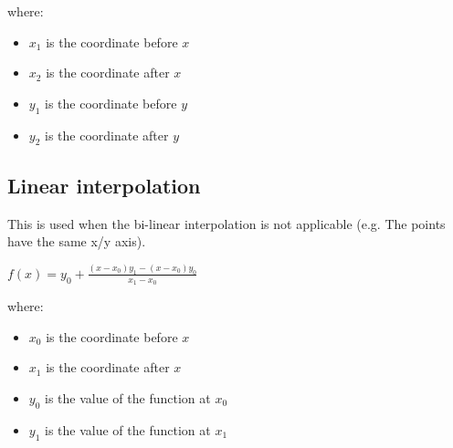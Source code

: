 where:
\begin{itemize}
\item $x_1$ is the coordinate before $x$
\item $x_2$ is the coordinate after $x$
\item $y_1$ is the coordinate before $y$
\item $y_2$ is the coordinate after $y$
\end{itemize}
\subsection{Linear interpolation}
This is used when the bi-linear interpolation is not applicable (e.g. The points have the same x/y axis).

$f(x) = y_0 + \frac{(x - x_0)y_1 - (x - x_0)y_0}{x_1 - x_0}$

where:
\begin{itemize}
\item $x_0$ is the coordinate before $x$
\item $x_1$ is the coordinate after $x$
\item $y_0$ is the value of the function at $x_0$
\item $y_1$ is the value of the function at $x_1$
\end{itemize}

